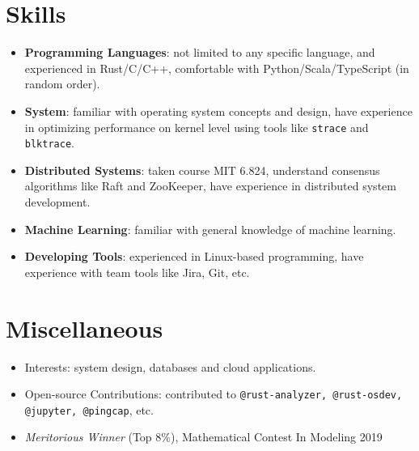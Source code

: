 \documentclass{resume}
\newcommand{\en}[1]{#1}
\newcommand{\zh}[1]{}
\begin{document}
\section{\en{Skills}\zh{技能}}
\begin{itemize}[parsep=0.25ex]
      \item \en{\textbf{Programming Languages}:
                  not limited to any specific language,
                  and experienced in Rust/C/C++,
                  comfortable with Python/Scala/TypeScript (in random order).}
            \zh{\textbf{编程语言}:
                  不局限于特定编程语言，且尤其熟悉 Rust/C/C++ 等，
                  了解 Python/Scala/TypeScript 等（不分先后）。}

      \item \en{\textbf{System}:
                  familiar with operating system concepts and design,
                  have experience in optimizing performance on kernel level using tools
                  like \texttt{strace} and \texttt{blktrace}.}
            \zh{\textbf{系统}:
                  熟悉各种操作系统内核的概念与设计，熟悉各种内核性能调优工具，例如 \texttt{strace} 和 \texttt{blktrace}。}

      \item \en{\textbf{Distributed Systems}:
                  taken course MIT 6.824,
                  understand consensus algorithms like Raft and ZooKeeper,
                  have experience in distributed system development.}
            \zh{\textbf{分布式系统}:
                  熟悉 Raft 等算法，有分布式系统开发经验。}

      \item \en{\textbf{Machine Learning}:
                  familiar with general knowledge of machine learning.}
            \zh{\textbf{机器学习}:
                  熟悉经典机器学习算法。}

      \item \en{\textbf{Developing Tools}:
                  experienced in Linux-based programming,
                  have experience with team tools like Jira, Git, etc.}
            \zh{\textbf{开发工具}:
                  十分熟悉 Linux，有 Jira、Git 等团队合作工具的经验。}
\end{itemize}

\section{\en{Miscellaneous}\zh{其他}}
\begin{itemize}
      \item \en{Interests: system design, databases and cloud applications.}
            \zh{兴趣：分布式系统、存储、数据库、云计算应用等。}
      \item \en{Open-source Contributions: contributed to \texttt{@rust-analyzer, @rust-osdev, @jupyter, @pingcap}, etc.}
            \zh{开源贡献: 为 \texttt{@rust-analyzer, @rust-osdev, @jupyter, @pingcap} 等组织贡献过代码。}
      \item \textit{Meritorious Winner} (Top 8\%), Mathematical Contest In Modeling 2019
\end{itemize}
\end{document}
